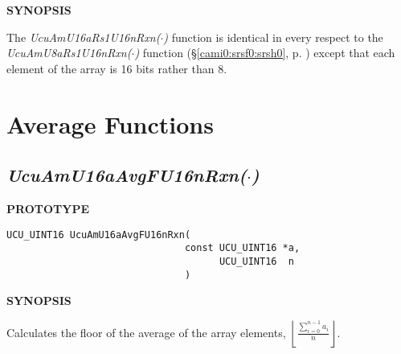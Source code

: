 \noindent\textbf{SYNOPSIS}
\begin{list}{}{\setlength{\leftmargin}{0.25in}\setlength{\topsep}{0.0in}}
\item The \emph{UcuAmU16aRs1U16nRxn($\cdot$)} function is identical in every
      respect to the \emph{UcuAmU8aRs1U16nRxn($\cdot$)} function
      (\S{}\ref{cami0:srsf0:srsh0}, p. \pageref{cami0:srsf0:srsh0})
      except that each element of the array is 16 bits
      rather than 8.
\end{list}
\vspace{2.8ex}


\section{Average Functions}
\label{cami0:safn0}


\subsection[\emph{UcuAmU16aAvgFU16nRxn(\protect\mbox{\protect$\cdot$})}]
           {\emph{UcuAmU16aAvgFU16nRxn(\protect\mbox{\protect\boldmath $\cdot$})}}
\label{cami0:safn0:savg0}

%

\noindent\textbf{PROTOTYPE}
\begin {list}{}{\setlength{\leftmargin}{0.25in}\setlength{\topsep}{0.0in}}
\item
\begin{verbatim}
UCU_UINT16 UcuAmU16aAvgFU16nRxn(
                               const UCU_UINT16 *a,
                                     UCU_UINT16  n
                               )
\end{verbatim}
\end{list}
\vspace{2.8ex}

\noindent\textbf{SYNOPSIS}
\begin{list}{}{\setlength{\leftmargin}{0.25in}\setlength{\topsep}{0.0in}}
\item Calculates the floor of the average of the array elements,
      $\displaystyle{\left\lfloor{\frac{\sum_{i=0}^{n-1}a_i}{n}}\right\rfloor}$.
\end{list}
\vspace{2.8ex}


